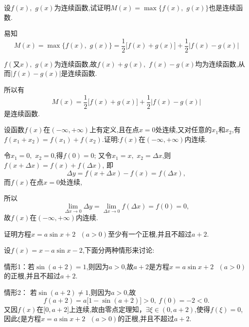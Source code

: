  \begin{problem}设$f(x),\mspace{6mu} g(x)$为连续函数,试证明$M(x) = \max\{ f(x),\mspace{6mu} g(x)\}$也是连续函数.
	
	\begin{solution} 易知 $$M(x) = \max\{ f(x),\mspace{6mu} g(x)\} = \frac{1}{2}\lbrack f(x) + g(x)\rbrack + \frac{1}{2}\left| f(x) - g(x) \right|$$
		
		$f(又x),\mspace{6mu} g(x)$为连续函数,故$f(x) + g(x),\mspace{6mu} f(x) - g(x)$均为连续函数,从而$\left| f(x) - g(x) \right|$是连续函数.
		
		所以有$$M(x) = \frac{1}{2}\lbrack f(x) + g(x)\rbrack + \frac{1}{2}\left| f(x) - g(x) \right|$$是连续函数.
		
	\end{solution}
	
\end{problem}

\begin{problem}
	设函数$f(x)$在$( - \infty, + \infty)$上有定义,且在点$x = 0$处连续,又对任意的$x_{1}$和$x_{2}$,有$f(x_{1} + x_{2}) = f(x_{1}) + f(x_{2})$.证明:$f(x)$在$( - \infty, + \infty)$内连续.
	
	\begin{solution} 令$x_{1} = 0,\mspace{6mu} x_{2} = 0$,得$f(0) = 0$;	
		又令$x_{1} = x,\mspace{6mu} x_{2} = \Delta x$,则$f(x + \Delta x) = f(x) + f(\Delta x)$,
		即
		$$\Delta y = f(x + \Delta x) - f(x) = f(\Delta x),$$ 而$f(x)$在点$x = 0$处连续,
		
		所以 $$\displaystyle \lim_{\Delta x \rightarrow 0}\Delta y = \lim_{\Delta x \rightarrow 0}f(\Delta x) = f(0) = 0,$$故$f(x)$在$( - \infty, + \infty)$内连续.
		
	\end{solution}
\end{problem}

\begin{problem}
	证明方程$x = a\sin x + 2\mspace{6mu}\mspace{6mu}(a > 0)$至少有一个正根,并且不超过$a + 2$.
	
	\begin{solution} 设$f(x) = x - a\sin x - 2$,下面分两种情形来讨论:
		
		情形1：若$\sin(a + 2) = 1$,则因为$a > 0$,故$a + 2$是方程$x = a\sin x + 2\mspace{6mu}\mspace{6mu}(a > 0)$的正根,并且不超过$a + 2$.
		
		情形2： 若$\sin(a + 2) \neq 1$,则因为$a > 0$,故$$f(a + 2) = a\lbrack 1 - \sin(a + 2)\rbrack > 0,\ f(0) = - 2 < 0.$$
		又因$f(x)$在$\lbrack 0,a + 2\rbrack$上连续,故由零点定理知，$\exists\xi \in (0,a + 2)$,使得$f(\xi) = 0$, 因此$\xi$是方程$x = a\sin x + 2\mspace{6mu}\mspace{6mu}(a > 0)$的正根,并且不超过$a + 2$.
		
	\end{solution}

\end{problem}
